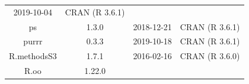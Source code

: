 \documentclass[11pt,]{book}
\begin{document}
\begin{longtable}[]{@{}cccc@{}}
\begin{minipage}[t]{0.16\columnwidth}
2019-10-04\strut
\end{minipage} & \begin{minipage}[t]{0.36\columnwidth}\centering\strut
CRAN (R 3.6.1)\strut
\end{minipage}\tabularnewline
\begin{minipage}[t]{0.18\columnwidth}\centering\strut
ps\strut
\end{minipage} & \begin{minipage}[t]{0.19\columnwidth}\centering\strut
1.3.0\strut
\end{minipage} & \begin{minipage}[t]{0.16\columnwidth}\centering\strut
2018-12-21\strut
\end{minipage} & \begin{minipage}[t]{0.36\columnwidth}\centering\strut
CRAN (R 3.6.1)\strut
\end{minipage}\tabularnewline
\begin{minipage}[t]{0.18\columnwidth}\centering\strut
purrr\strut
\end{minipage} & \begin{minipage}[t]{0.19\columnwidth}\centering\strut
0.3.3\strut
\end{minipage} & \begin{minipage}[t]{0.16\columnwidth}\centering\strut
2019-10-18\strut
\end{minipage} & \begin{minipage}[t]{0.36\columnwidth}\centering\strut
CRAN (R 3.6.1)\strut
\end{minipage}\tabularnewline
\begin{minipage}[t]{0.18\columnwidth}\centering\strut
R.methodsS3\strut
\end{minipage} & \begin{minipage}[t]{0.19\columnwidth}\centering\strut
1.7.1\strut
\end{minipage} & \begin{minipage}[t]{0.16\columnwidth}\centering\strut
2016-02-16\strut
\end{minipage} & \begin{minipage}[t]{0.36\columnwidth}\centering\strut
CRAN (R 3.6.0)\strut
\end{minipage}\tabularnewline
\begin{minipage}[t]{0.18\columnwidth}\centering\strut
R.oo\strut
\end{minipage} & \begin{minipage}[t]{0.19\columnwidth}\centering\strut
1.22.0\strut
\end{minipage} & \begin{minipage}[t]{0.16\columnwidth}\centering\strut

\end{minipage}
\end{longtable}
\end{document}
